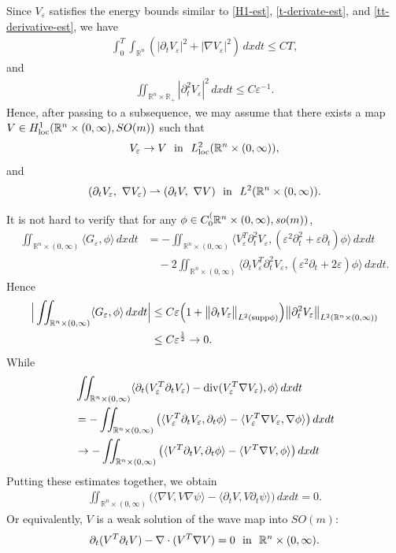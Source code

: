 \documentclass[12pt,twoside,reqno]{amsart}
\theoremstyle{definition}              %
\theoremstyle{remark}                  %
\newcommand{\R}{\mathbb{R}}                 %
\newcommand{\eps}{\varepsilon}
\renewcommand{\1}{\mathbbm{1}}                                      %
\numberwithin{equation}{section}
\numberwithin{definition}{section}
\numberwithin{theorem}{section}
\numberwithin{remark}{section}
\begin{document}
Since $V_\eps$ satisfies the energy bounds similar to \eqref{H1-est}, \eqref{t-derivate-est}, and \eqref{tt-derivative-est}, we have
\begin{align*}
\int_{0}^T\int_{\R^n} (|\partial_t V_\eps|^2+|\nabla V_\eps|^2)\,dxdt \le CT,
\end{align*}
and
\begin{align*}
   \iint_{\R^n\times\R_+}|\partial_t^2 V_\eps|^2\,dxdt\le C\eps^{-1}.
\end{align*}
Hence, after passing to a subsequence, we may assume that
there exists a map $V\in H^1_{\rm{loc}}(\R^n\times (0,\infty), SO(m))$ such that
$$V_\eps\rightarrow V \ \ {\rm{in}}\ \ L^2_{\rm{loc}}(\R^n\times (0,\infty)),$$
and
$$
(\partial_t V_\eps, \ \nabla V_\eps)\rightharpoonup 
(\partial_t V, \ \nabla V)\ \ {\rm{in}}\ \ L^2(\R^n\times (0,\infty)).
$$

It is not hard to verify that for
any $\phi\in C_0^(\R^n\times (0,\infty), {\it so}(m))$,
\begin{align*}
\iint_{\R^n\times (0,\infty)}
\langle G_\eps, \phi\rangle\,dxdt
&=-\iint_{\R^n\times (0,\infty)}\langle V_\eps^T\partial_t^2V_\eps,
(\eps^2\partial_t^2+\eps\partial_t)\phi\rangle\,dxdt\\
&\quad-2\iint_{\R^n\times (0,\infty)}\langle\partial_tV_\eps^T\partial_t^2V_\eps, (\eps^2\partial_t+2\eps)\phi\rangle\,dxdt.
\end{align*}
Hence
\begin{align*}
\Big|\iint_{\R^n\times (0,\infty)}
\langle G_\eps, \phi\rangle\,dxdt\Big|
&\le C\eps \Big(1+\big\|\partial_t V_\eps\big\|_{L^2({\rm{supp}}\phi)}\Big)\big\|\partial_t^2V_\eps\big\|_{L^2(\R^n\times (0,\infty))}\\
&\le C\eps^{\frac12}\to 0.
\end{align*}
While
\begin{align*}
&\iint_{\R^n\times(0,\infty)}\langle\partial_t(V_\eps^T\partial_tV_\eps) -{\rm{div}}(V_\eps^T\nabla V_\eps),\phi\rangle\,dxdt\\
&=-\iint_{\R^n\times(0,\infty)}\big(\langle V_\eps^T\partial_tV_\eps,\partial_t\phi\rangle -\langle V_\eps^T\nabla V_\eps,\nabla\phi\rangle\big)\,dxdt\\
&\rightarrow -\iint_{\R^n\times(0,\infty)}\big(\langle V^T\partial_tV,\partial_t\phi\rangle -\langle V^T\nabla V,\phi\rangle\big)\,dxdt
\end{align*}
Putting these estimates together, we obtain
\begin{align}\label{wavemap-so(m)1}
 \iint_{\R^{n}\times (0,\infty)} \Big(\langle\nabla V, V\nabla\psi\rangle-\langle \partial_t V, V\partial_t\psi\rangle\Big)\,dxdt =0.  
\end{align}
Or equivalently, $V$ is a weak solution of the wave map into $SO(m)$:
\begin{align}\label{wavemap-so(m)2}
\partial_t(V^T\partial_t V)-\nabla\cdot(V^T\nabla V)=0 
\ \ {\rm{in}}\ \ \R^{n}\times (0,\infty).    
\end{align}
\end{document}
